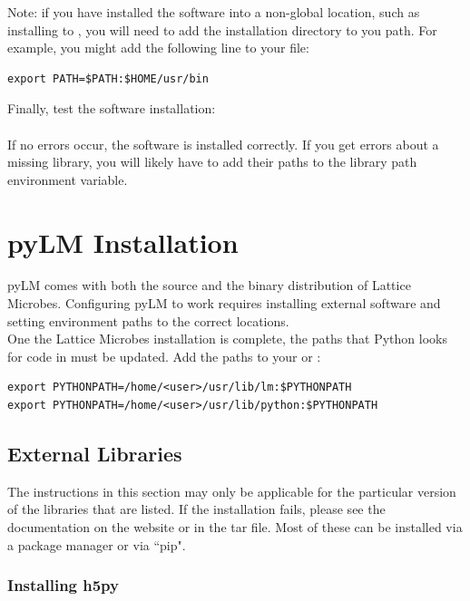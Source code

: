 Note: if you have installed the software into a non-global location, such as installing to , you will need to add the installation directory to you path. For example, you might add the following line to your  file:
{\small\begin{verbatim}
export PATH=$PATH:$HOME/usr/bin
\end{verbatim}}

Finally, test the software installation:\\

 \\
 
If no errors occur, the software is installed correctly.  If you get errors about a missing library, you will likely have to add their paths to the library path environment variable.  


\section{pyLM Installation} \label{sec:pyInstall}

pyLM comes with both the source and the binary distribution of Lattice Microbes.  Configuring pyLM to work requires installing external software and setting environment paths to the correct locations. \\

One the Lattice Microbes installation is complete, the paths that Python looks for code in must be updated.  Add the paths to your   or :

\begin{verbatim}
export PYTHONPATH=/home/<user>/usr/lib/lm:$PYTHONPATH
export PYTHONPATH=/home/<user>/usr/lib/python:$PYTHONPATH
\end{verbatim}

\subsection{External Libraries}
The instructions in this section may only be applicable for the particular version of the libraries that are listed.  If the installation fails, please see the documentation on the website or in the tar file.  Most of these can be installed via a package manager or via ``pip".

\subsubsection{Installing h5py}

